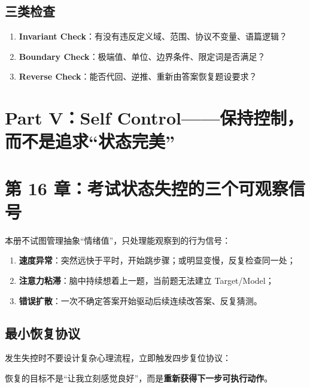 \documentclass[11pt,a4paper]{ctexart}
\newcommand{\kw}[1]{\textbf{#1}}
\begin{document}
\subsection{三类检查}
\begin{enumerate}
  \item \kw{Invariant Check}：有没有违反定义域、范围、协议不变量、语篇逻辑？
  \item \kw{Boundary Check}：极端值、单位、边界条件、限定词是否满足？
  \item \kw{Reverse Check}：能否代回、逆推、重新由答案恢复题设要求？
\end{enumerate}

\newpage
\section{Part V：Self Control——保持控制，而不是追求“状态完美”}

\section{第 16 章：考试状态失控的三个可观察信号}
本册不试图管理抽象“情绪值”，只处理能观察到的行为信号：
\begin{enumerate}
  \item \kw{速度异常}：突然远快于平时，开始跳步骤；或明显变慢，反复检查同一处；
  \item \kw{注意力粘滞}：脑中持续想着上一题，当前题无法建立 Target/Model；
  \item \kw{错误扩散}：一次不确定答案开始驱动后续连续改答案、反复猜测。
\end{enumerate}

\subsection{最小恢复协议}
发生失控时不要设计复杂心理流程，立即触发四步复位协议：

\begin{center}
\end{center}
恢复的目标不是“让我立刻感觉良好”，而是\kw{重新获得下一步可执行动作}。
\end{document}
